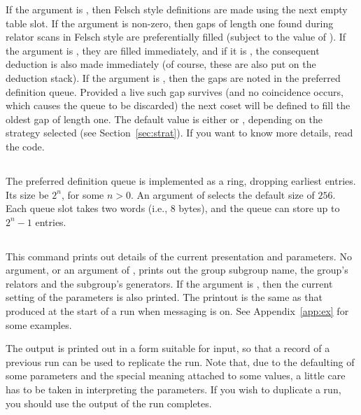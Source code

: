 If the argument is , then Felsch style definitions are made using
  the next empty table slot.
If the argument is non-zero, then gaps of length one found during relator
  scans in Felsch style are preferentially filled (subject to the value
  of ).
If the argument is , they are filled immediately, and if it is
  , the consequent deduction is also made immediately (of course,
  these are also put on the deduction stack).  
If the argument is , then the gaps are noted in the preferred
  definition queue.  
Provided a live such gap survives (and no coincidence occurs, which causes
  the queue to be discarded) the next coset will be defined to fill the
  oldest gap of length one.
The default value is either  or , depending on the strategy
  selected (see Section~\ref{sec:strat}).
If you want to know more details, read the code.

\subsection{}

The preferred definition queue is implemented as a ring, dropping
  earliest entries.
Its size  be $2^n$\kern-2pt, for some $n>0$.
An argument of  selects the default size of $256$.
Each queue slot takes two words (i.e., 8 bytes), and the queue can store
  up to $2^n-1$ entries.

\subsection{}

This command prints out details of the current presentation and parameters.
No argument, or an argument of , prints out the group \amp
  subgroup name, the group's relators and the subgroup's generators.
If the argument is , then the current setting of the parameters is
  also printed.
The printout is the same as that produced at the start of a run when
  messaging is on.
See Appendix~\ref{app:ex} for some examples.

The output is printed out in a form suitable for input, so that a record
  of a previous run can be used to replicate the run.
Note that, due to the defaulting of some parameters and the special
  meaning attached to some values, a little care has to be taken in
  interpreting the parameters.
If you wish to  duplicate a run, you should use the output
  of   the run completes.


